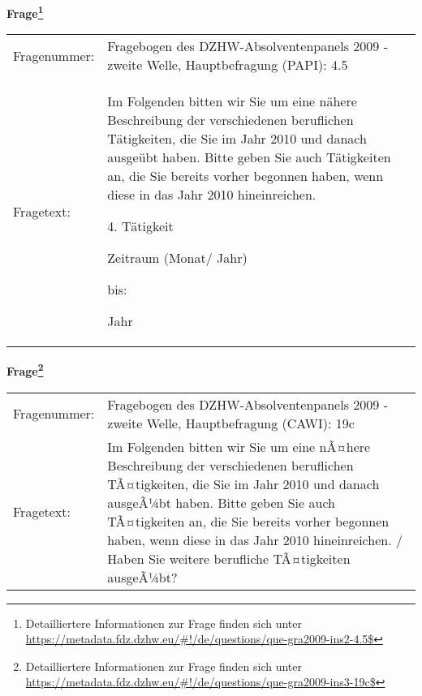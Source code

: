 				\vspace*{0.5cm}
                \noindent\textbf{Frage\footnote{Detailliertere Informationen zur Frage finden sich unter
		              \url{https://metadata.fdz.dzhw.eu/\#!/de/questions/que-gra2009-ins2-4.5$}}}\\
				\begin{tabularx}{\hsize}{@{}lX}
					Fragenummer: &
					  Fragebogen des DZHW-Absolventenpanels 2009 - zweite Welle, Hauptbefragung (PAPI):
					  4.5
 \\
					Fragetext: & Im Folgenden bitten wir Sie um eine nähere Beschreibung der verschiedenen beruflichen Tätigkeiten, die Sie im Jahr 2010 und danach ausgeübt haben. Bitte geben Sie auch Tätigkeiten an, die Sie bereits vorher begonnen haben, wenn diese in das Jahr 2010 hineinreichen.\par  4. Tätigkeit\par  Zeitraum (Monat/ Jahr)\par  bis:\par  Jahr \\
				\end{tabularx}
				\vspace*{0.5cm}
                \noindent\textbf{Frage\footnote{Detailliertere Informationen zur Frage finden sich unter
		              \url{https://metadata.fdz.dzhw.eu/\#!/de/questions/que-gra2009-ins3-19c$}}}\\
				\begin{tabularx}{\hsize}{@{}lX}
					Fragenummer: &
					  Fragebogen des DZHW-Absolventenpanels 2009 - zweite Welle, Hauptbefragung (CAWI):
					  19c
 \\
					Fragetext: & Im Folgenden bitten wir Sie um eine nÃ¤here Beschreibung der verschiedenen beruflichen TÃ¤tigkeiten, die Sie im Jahr 2010 und danach ausgeÃ¼bt haben. Bitte geben Sie auch TÃ¤tigkeiten an, die Sie bereits vorher begonnen haben, wenn diese in das Jahr 2010 hineinreichen. / Haben Sie weitere berufliche TÃ¤tigkeiten ausgeÃ¼bt? \\
				\end{tabularx}





